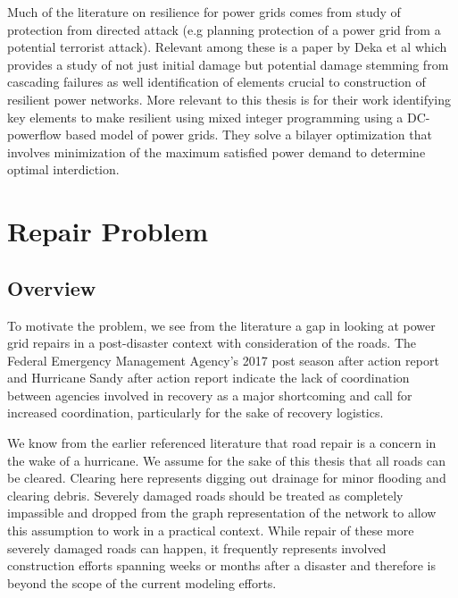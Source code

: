 \documentclass{article}
\begin{document}
		Much of the literature on resilience for power grids comes from study of protection from directed attack (e.g planning protection of a power grid from a potential terrorist attack). Relevant among these is a paper by Deka et al \cite{Deka2018} which provides a study of not just initial damage but potential damage stemming from cascading failures as well identification of elements crucial to construction of resilient power networks. More relevant to this thesis is \cite{Salmeron2004} for their work identifying key elements to make resilient using mixed integer programming using a DC-powerflow based model of power grids. They solve a bilayer optimization that involves minimization of the maximum satisfied power demand to determine optimal interdiction.


	
	\section{Repair Problem}
	
	\subsection{Overview}
	To motivate the problem, we see from the literature a gap in looking at power grid repairs in a post-disaster context with consideration of the roads. The Federal Emergency Management Agency's 2017 post season after action report \cite{FEMA2017AAR}  and Hurricane Sandy after action report \cite{FEMASandyAAR} indicate the lack of coordination between agencies involved in recovery as a major shortcoming and call for increased coordination, particularly for the sake of recovery logistics.
	
	We know from the earlier referenced literature that road repair is a concern in the wake of a hurricane. We assume for the sake of this thesis that all roads can be cleared. Clearing here represents digging out drainage for minor flooding and clearing debris. Severely damaged roads should be treated as completely impassible and dropped from the graph representation of the network to allow this assumption to work in a practical context. While repair of these more severely damaged roads can happen, it frequently represents involved construction efforts spanning weeks or months after a disaster and therefore is beyond the scope of the current modeling efforts.
	
\end{document}
